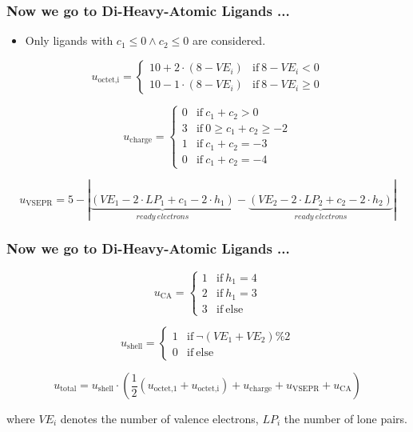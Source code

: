 \documentclass{beamer}
\begin{document}
\begin{frame}
\frametitle{Now we go to Di-Heavy-Atomic Ligands ...}
\begin{itemize}
	\item Only ligands with $c_1 \leq 0 \wedge c_2 \leq 0$ are considered.
\end{itemize}

\begin{equation}
u_{\textrm{octet,i}} = 
\begin{cases}
10 + 2 \cdot (8-VE_i) 	& \mathrm{if}~ 8-VE_i < 0 \\
10 - 1 \cdot (8-VE_i) 	& \mathrm{if}~ 8-VE_i \geq 0
\end{cases}
\end{equation}

\begin{equation}
u_{\textrm{charge}} = 
\begin{cases}
0	&	\mathrm{if}~ c_1 + c_2 > 0 \\
3	&	\mathrm{if}~ 0 \geq c_1 + c_2 \geq -2 \\
1   &	\mathrm{if}~ c_1 + c_2 = -3 \\
0   &	\mathrm{if}~ c_1 + c_2 = -4 
\end{cases}
\end{equation}

\begin{equation}
u_{\textrm{VSEPR}} = 
 5-|\underbrace{(VE_1 - 2 \cdot LP_1 + c_1 - 2 \cdot h_1)}_{ready~electrons} -  \underbrace{(VE_2 - 2 \cdot LP_2 + c_2 - 2 \cdot h_2)}_{ready~electrons}|
\end{equation}
\end{frame}



\begin{frame}
\frametitle{Now we go to Di-Heavy-Atomic Ligands ...}

\begin{equation}
u_{\textrm{CA}} = 
\begin{cases}
1	&	\mathrm{if}~ h_1 = 4 \\
2	&	\mathrm{if}~ h_1 = 3 \\
3   &	\mathrm{if}~ \textrm{else} 
\end{cases}
\end{equation}

\begin{equation}
u_{\textrm{shell}} = 
\begin{cases}
1	&	\mathrm{if}~ \neg (VE_1+VE_2) \% 2 \\
0	&	\mathrm{if}~ \textrm{else}
\end{cases}
\end{equation}

\begin{equation}
u_{\textrm{total}} = u_{\textrm{shell}} \cdot \left( \frac{1}{2} ( u_{\textrm{octet,1}} + u_{\textrm{octet,i}} ) + u_{\textrm{charge}} + u_{\textrm{VSEPR}} + u_{\textrm{CA}} \right)
\end{equation}

where $VE_i$ denotes the number of valence electrons, $LP_i$ the number of lone pairs.
\end{frame}
\end{document}
